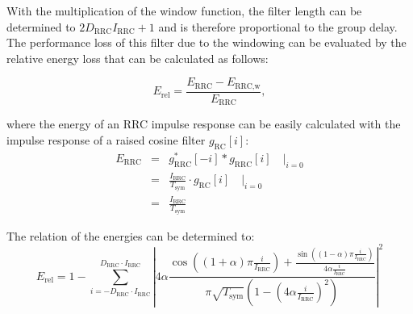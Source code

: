 With the multiplication of the window function, the filter length can be determined to $2D_\text{RRC}I_\text{RRC}+1$ and is therefore proportional to the group delay. The performance loss of this filter due to the windowing can be evaluated by the relative energy loss that can be calculated as follows: 

\begin{equation}
E_\text{rel} = \frac{E_\text{RRC}-E_\text{RRC,w}}{E_\text{RRC}},
\end{equation}

where the energy of an RRC impulse response can be easily calculated with the impulse response of a raised cosine filter $g_\text{RC}[i]$:
\begin{eqnarray}
E_\text{RRC} & = & g_\text{RRC}^*[-i] * g_\text{RRC}[i] \quad |_{i=0} \\
						& = & \frac{I_\text{RRC}}{T_\text{sym}} \cdot g_\text{RC}[i] \quad |_{i=0} \\
						& = & \frac{I_\text{RRC}}{T_\text{sym}}
\end{eqnarray}

The relation of the energies can be determined to:
\begin{equation}
E_\text{rel} = 1- \sum_{i=-D_\text{RRC} \cdot I_\text{RRC}}^{D_\text{RRC} \cdot I_\text{RRC}} \left| 4 \alpha \frac{\cos \left((1+\alpha)\pi \frac{i}{I_\text{RRC}} \right) + \frac{\sin \left( (1-\alpha)\pi \frac{i}{I_\text{RRC}}\right)}{4 \alpha \frac{i}{I_\text{RRC}}}}{\pi \sqrt{T_\text{sym}} \left(1-\left(4 \alpha \frac{i}{I_\text{RRC}} \right)^2 \right)}\right|^2
\end{equation}

